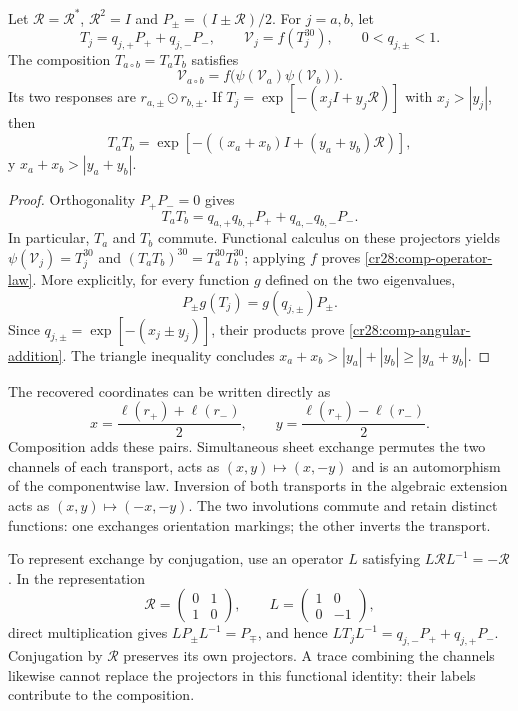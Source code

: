 \begin{proposition}
\label{cr28:comp-operator}
Let $\mathcal R=\mathcal R^*$, $\mathcal R^2=I$ and
$P_\pm=(I\pm\mathcal R)/2$. For $j=a,b$, let
\[
 T_j=q_{j,+}P_++q_{j,-}P_-,\qquad
 \mathcal V_j=f(T_j^{30}),\qquad 0<q_{j,\pm}<1.
\]
The composition $T_{a\circ b}=T_aT_b$ satisfies
\begin{equation}
 \mathcal V_{a\circ b}
 =f\bigl(\psi(\mathcal V_a)\psi(\mathcal V_b)\bigr).
 \label{cr28:comp-operator-law}
\end{equation}
Its two responses are $r_{a,\pm}\odot r_{b,\pm}$. If
$T_j=\exp[-(x_jI+y_j\mathcal R)]$ with $x_j>|y_j|$, then
\begin{equation}
 T_aT_b=
 \exp[-((x_a+x_b)I+(y_a+y_b)\mathcal R)],
 \label{cr28:comp-angular-addition}
\end{equation}
y $x_a+x_b>|y_a+y_b|$.
\end{proposition}
\begin{proof}
Orthogonality $P_+P_-=0$ gives
\[
 T_aT_b=q_{a,+}q_{b,+}P_++q_{a,-}q_{b,-}P_-.
\]
In particular, $T_a$ and $T_b$ commute. Functional calculus on these
projectors yields
$\psi(\mathcal V_j)=T_j^{30}$ and
$(T_aT_b)^{30}=T_a^{30}T_b^{30}$; applying $f$ proves
\eqref{cr28:comp-operator-law}. More explicitly, for every function $g$
defined on the two eigenvalues,
\[
 P_\pm g(T_j)=g(q_{j,\pm})P_\pm.
\]
Since $q_{j,\pm}=\exp[-(x_j\pm y_j)]$, their products prove
\eqref{cr28:comp-angular-addition}. The triangle inequality concludes
$x_a+x_b>|y_a|+|y_b|\geq|y_a+y_b|$.
\end{proof}

The recovered coordinates can be written directly as
\[
 x=\frac{\ell(r_+)+\ell(r_-)}2,\qquad
 y=\frac{\ell(r_+)-\ell(r_-)}2.
\]
Composition adds these pairs. Simultaneous sheet exchange permutes the
two channels of each transport, acts as $(x,y)\mapsto(x,-y)$ and is an
automorphism of the componentwise law. Inversion of both transports in
the algebraic extension acts as $(x,y)\mapsto(-x,-y)$. The two
involutions commute and retain distinct functions: one exchanges
orientation markings; the other inverts the transport.

To represent exchange by conjugation, use an operator $L$ satisfying
$L\mathcal R L^{-1}=-\mathcal R$. In the representation
\[
 \mathcal R=\begin{pmatrix}0&1\\1&0\end{pmatrix},\qquad
 L=\begin{pmatrix}1&0\\0&-1\end{pmatrix},
\]
direct multiplication gives $LP_\pm L^{-1}=P_\mp$, and hence
$LT_jL^{-1}=q_{j,-}P_++q_{j,+}P_-$. Conjugation by $\mathcal R$
preserves its own projectors. A trace combining the channels likewise
cannot replace the projectors in this functional identity: their labels
contribute to the composition.

